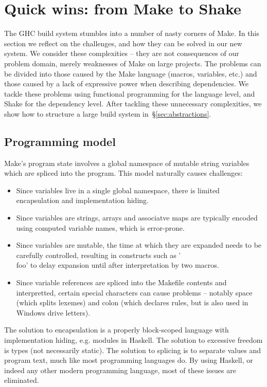 \section{Quick wins: from Make to Shake\label{sec:solutions}}

The GHC build system stumbles into a number of nasty corners of Make. In this
section we reflect on the challenges, and how they can be solved in
our new system. We consider these  complexities --
they are not consequences of our problem domain, merely weaknesses of Make on
large projects. The problems can be divided into those caused by the
Make language (macros, variables, etc.) and those caused by a lack of expressive
power when describing dependencies. We tackle these problems using
functional programming for the language level, and Shake for the dependency
level. After tackling these unnecessary complexities, we show how to structure a
large build system in~\S\ref{sec:abstractions}.

\subsection{Programming model}

Make's program state involves a global namespace of mutable string variables which are
spliced into the program. This model naturally causes challenges:

\begin{itemize}
\item Since variables live in a single global namespace, there is limited
encapsulation and implementation hiding.
\item Since variables are strings, arrays and associatve maps are typically
encoded using computed variable names, which is error-prone.
\item Since variables are mutable, the time at which they are expanded needs
to be carefully controlled, resulting in constructs such as \lst'$$$$foo' to
delay expansion until after interpretation by two macros.
\item Since variable references are spliced into the Makefile contents
and interpretted, certain special characters can cause problems --
notably space (which splits lexemes) and colon (which declares rules, but is
also used in Windows drive letters).
\end{itemize}

The solution to encapsulation is a properly block-scoped language with implementation
hiding, e.g. modules in Haskell. The solution to excessive
freedom is types (not necessarily static). The solution to
splicing is to separate values and program text, much like most programming
languages do. By using Haskell, or indeed any other modern programming language,
most of these issues are eliminated.

